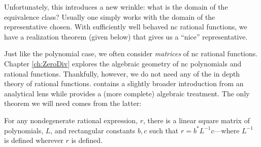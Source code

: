 Unfortunately, this introduces a new wrinkle: what is the domain of the
equivalence class? Usually one simply works with the
domain of the representative chosen. With sufficiently well behaved nc rational
functions, we have a realization theorem (given below) that gives us a ``nice'' representative.

Just like the polynomial case, we often consider \emph{matrices} of nc rational
functions. Chapter \ref{ch:ZeroDiv} explores the algebraic geometry of nc
polynomials and rational functions. Thankfully, however, we do not
need any of the in depth theory of rational functions. \cite{heltonFree2013}
contains a slightly broader introduction from an analytical lens while \cite{cohnFree2006}
provides a (more complete) algebraic treatment. The only theorem we will need
comes from the latter:

\begin{theorem}
\label{thm:ratchar}
  For any nondegenerate
  rational expression, \(r\), there is a linear square matrix of polynomials, \(L\), and
  rectangular constants \(b,c\) such that \(r=b^*L ^{-1}c\)---where \(L ^{-1}\) is
  defined wherever \(r\) is defined.
\end{theorem}
